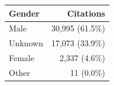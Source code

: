 \begin{tabular}{lr}
    \toprule
    Gender & Citations \\
    \midrule
    Male    & 30,995 (61.5\%) \\
    Unknown & 17,073 (33.9\%) \\
    Female  &  2,337 (4.6\%)  \\
    Other   &     11 (0.0\%)  \\
    \bottomrule
\end{tabular}
